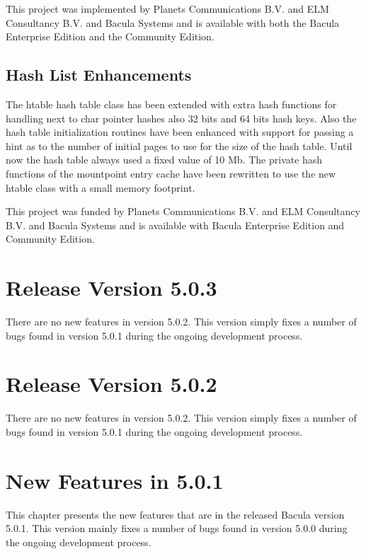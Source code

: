 \medskip
This project was implemented by Planets Communications B.V. and ELM
Consultancy B.V. and Bacula Systems and is available with both the Bacula
Enterprise Edition and the Community Edition.

\subsection{Hash List Enhancements}

The htable hash table class has been extended with extra hash functions for
handling next to char pointer hashes also 32 bits and 64 bits hash keys.
Also the hash table initialization routines have been enhanced with
support for passing a hint as to the number of initial pages to use
for the size of the hash table. Until now the hash table always used
a fixed value of 10 Mb. The private hash functions of the mountpoint entry
cache have been rewritten to use the new htable class with a small memory
footprint.

\medskip
This project was funded by Planets Communications B.V. and ELM Consultancy B.V.
and Bacula Systems and is available with Bacula Enterprise Edition and
Community Edition.



\section{Release Version 5.0.3}

There are no new features in version 5.0.2.  This version simply fixes a
number of bugs found in version 5.0.1 during the ongoing development
process.

\section{Release Version 5.0.2}

There are no new features in version 5.0.2.  This version simply fixes a
number of bugs found in version 5.0.1 during the ongoing development
process.


\section{New Features in 5.0.1}

This chapter presents the new features that are in the released Bacula version
5.0.1. This version mainly fixes a number of bugs found in version 5.0.0 during
the ongoing development process.

